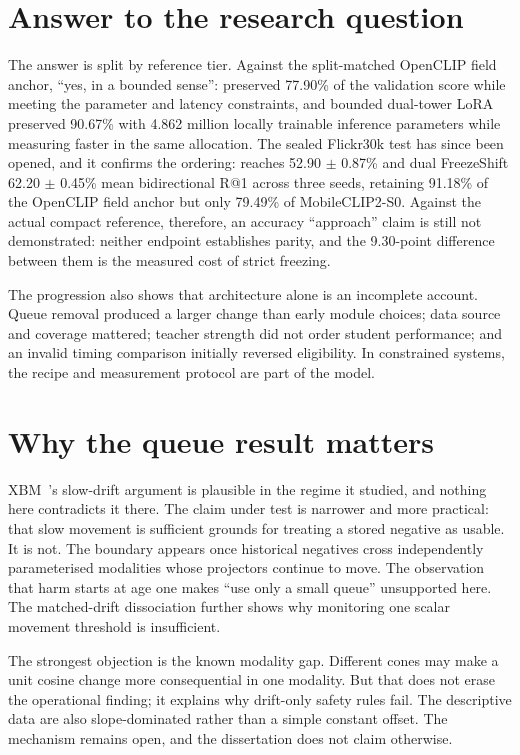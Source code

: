 \section{Answer to the research question}
The answer is split by reference tier. Against the split-matched OpenCLIP field anchor, ``yes, in a bounded sense'': \MTone{} preserved 77.90\% of the validation score while meeting the parameter and latency constraints, and bounded dual-tower LoRA preserved 90.67\% with 4.862 million locally trainable inference parameters while measuring faster in the same allocation. The sealed Flickr30k test has since been opened, and it confirms the ordering: \MTone{} reaches 52.90 $\pm$ 0.87\% and dual FreezeShift 62.20 $\pm$ 0.45\% mean bidirectional R@1 across three seeds, retaining 91.18\% of the OpenCLIP field anchor but only 79.49\% of MobileCLIP2-S0. Against the actual compact reference, therefore, an accuracy ``approach'' claim is still not demonstrated: neither endpoint establishes parity, and the 9.30-point difference between them is the measured cost of strict freezing.

The progression also shows that architecture alone is an incomplete account. Queue removal produced a larger change than early module choices; data source and coverage mattered; teacher strength did not order student performance; and an invalid timing comparison initially reversed eligibility. In constrained systems, the recipe and measurement protocol are part of the model.

\section{Why the queue result matters}
XBM~\cite{wang2020xbm}'s slow-drift argument is plausible in the regime it studied, and nothing here contradicts it there. The claim under test is narrower and more practical: that slow movement is sufficient grounds for treating a stored negative as usable. It is not. The boundary appears once historical negatives cross independently parameterised modalities whose projectors continue to move. The observation that harm starts at age one makes ``use only a small queue'' unsupported here. The matched-drift dissociation further shows why monitoring one scalar movement threshold is insufficient.

The strongest objection is the known modality gap. Different cones may make a unit cosine change more consequential in one modality. But that does not erase the operational finding; it explains why drift-only safety rules fail. The descriptive data are also slope-dominated rather than a simple constant offset. The mechanism remains open, and the dissertation does not claim otherwise.

